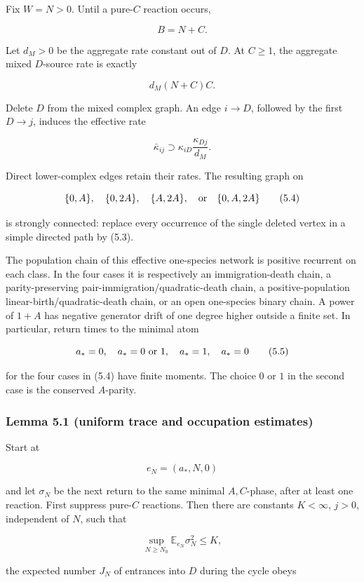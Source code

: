 Fix \(W=N>0\). Until a pure-\(C\) reaction occurs,

\[
 B=N+C.
\tag{5.1}
\]

Let \(d_M>0\) be the aggregate rate constant out of \(D\). At \(C\ge1\),
the aggregate mixed \(D\)-source rate is exactly

\[
 d_M(N+C)C.
\tag{5.2}
\]

Delete \(D\) from the mixed complex graph. An edge \(i\to D\), followed
by the first \(D\to j\), induces the effective rate

\[
 \bar\kappa_{ij}\supset
 \kappa_{iD}\frac{\kappa_{Dj}}{d_M}.
\tag{5.3}
\]

Direct lower-complex edges retain their rates. The resulting graph on

\[
 \{0,A\},\quad\{0,2A\},\quad\{A,2A\},
 \quad\hbox{or}\quad\{0,A,2A\}
\tag{5.4}
\]

is strongly connected: replace every occurrence of the single deleted
vertex in a simple directed path by (5.3).

The population chain of this effective one-species network is positive
recurrent on each class. In the four cases it is respectively an
immigration-death chain, a parity-preserving
pair-immigration/quadratic-death chain, a positive-population
linear-birth/quadratic-death chain, or an open one-species binary chain.
A power of \(1+A\) has negative generator drift of one degree higher
outside a finite set. In particular, return times to the minimal atom

\[
 a_*=0,\quad a_*=0\hbox{ or }1,\quad a_*=1,\quad a_*=0
\tag{5.5}
\]

for the four cases in (5.4) have finite moments. The choice \(0\) or
\(1\) in the second case is the conserved \(A\)-parity.

\subsubsection{Lemma 5.1 (uniform trace and occupation
estimates)}

Start at

\[
 e_N=(a_*,N,0)
\tag{5.6}
\]

and let \(\sigma_N\) be the next return to the same minimal
\(A,C\)-phase, after at least one reaction. First suppress pure-\(C\)
reactions. Then there are constants \(K<\infty\), \(j>0\), independent
of \(N\), such that

\[
 \sup_{N\ge N_0}\mathbb E_{e_N}\sigma_N^2\le K,
\tag{5.7}
\]

the expected number \(J_N\) of entrances into \(D\) during the cycle
obeys

